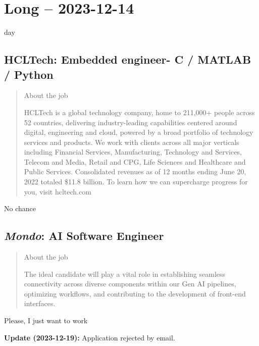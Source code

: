 \documentclass[
	letterpaper, %
	12pt, %
]{CSSullivanBusinessReport}
\begin{document}

\section[14 Dec: Short]{Long -- 2023-12-14} %

day


\subsection[HCLTech]{HCLTech: Embedded engineer- C / MATLAB / Python}

\begin{quote}
	About the job
	
	HCLTech is a global technology company, home to 211,000+ people across 52 countries, delivering industry-leading capabilities centered around digital, engineering and cloud, powered by a broad portfolio of technology services and products. We work with clients across all major verticals including Financial Services, Manufacturing, Technology and Services, Telecom and Media, Retail and CPG, Life Sciences and Healthcare and Public Services. Consolidated revenues as of 12 months ending June 20, 2022 totaled \$11.8 billion. To learn how we can supercharge progress for you, visit hcltech.com

\end{quote}

No chance


\subsection[\textit{Mondo}]{\textit{Mondo}: AI Software Engineer}

\begin{quote}
	About the job
	
	The ideal candidate will play a vital role in establishing seamless connectivity across diverse components within our Gen AI pipelines, optimizing workflows, and contributing to the development of front-end interfaces.

\end{quote}

Please, I just want to work

\textbf{Update (2023-12-19):} Application rejected by email.
\end{document}

